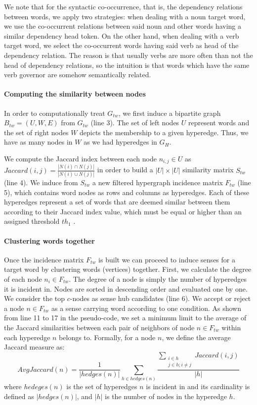 We note that for the syntactic co-occurrence, that is, the dependency relations between words, we apply two strategies: when dealing with a noun target word, we use the co-occurrent relations between said noun and other words having a similar  dependency head token. On the other hand, when dealing with a verb target word, we select the co-occurrent words having said verb as head of the dependency relation.  The reason is that usually verbs are more often than not the head of dependency relations, so the intuition is that words which have the same verb governor are somehow semantically related. %

\paragraph{Computing the similarity between nodes}
In order to computationally treat $G_{tw}$, we first induce a bipartite graph $B_{tw}=(U,W,E)$ from $G_{tw}$ (line 3). The set of left nodes $U$ represent words and the set of right nodes $W$ depicts the membership to a given hyperedge. Thus, we have as many nodes in $W$  as we had hyperedges in $G_H$.

We compute the Jaccard index between each node $n_{i,j} \in U$ as $Jaccard(i,j)=\frac{|N(i)\cap N(j)|}{|N(i)\cup N(j)|}$ in order to build a $|U|\times|U|$ similarity matrix $S_{tw}$ (line 4). We induce from $S_{tw}$ a new filtered  hypergraph incidence matrix $F_{tw}$ (line 5), which contains word nodes as rows and columns as hyperedges. Each of these hyperedges represent a set of words that are deemed similar between them according to their Jaccard  index value, which must be equal or higher than an assigned threshold $th_1$ .  

\paragraph{Clustering words  together}
Once the incidence matrix $F_{tw}$ is built we can proceed to induce senses for a target word by clustering words (vertices) together. First, we calculate the degree of each node $n_i \in F_{tw}$. The degree of a node is simply the number of hyperedges it is incident in. Nodes are sorted in descending order and evaluated one by one. We consider the top $c$-nodes as sense hub candidates (line 6). We accept or reject a node $n \in F_{tw}$ as a sense carrying word according to one condition. As shown from line 11 to 17 in the pseudo-code, we set a minimum limit to the average of the Jaccard similarities between each pair of neighbors of node $n \in F_{tw}$ within each hyperedge  $n$ belongs to. Formally, for a node $n$, we define the average Jaccard measure as: $$AvgJaccard(n)=\frac{1}{|hedges(n)|}\sum_{h\in hedges(n)}\frac{\sum_{\substack{i\in h\\j\in h;i\neq j}}Jaccard(i,j)}{|h|}$$ 
where $hedeges(n)$ is the set of hyperedges $n$ is incident in and its cardinality is defined as $|hedges(n)|$, and $|h|$ is the number of nodes in the hyperedge $h$. 

